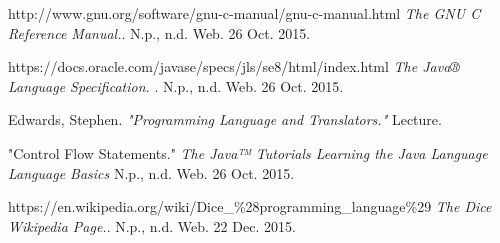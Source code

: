 \begin{homeworkProblem}
	
	
	\begin{thebibliography}{9}
		http://www.gnu.org/software/gnu-c-manual/gnu-c-manual.html
		\textit{The GNU C Reference Manual.}. 
		N.p., n.d. Web. 26 Oct. 2015.
		
		https://docs.oracle.com/javase/specs/jls/se8/html/index.html
		\textit{The Java® Language Specification.  }.
		N.p., n.d. Web. 26 Oct. 2015.
		
		Edwards, Stephen.
		\textit{"Programming Language and Translators."}
		 Lecture.
		 
		 "Control Flow Statements."
		 \textit{The Java™ Tutorials Learning the Java Language Language Basics}
		 N.p., n.d. Web. 26 Oct. 2015.
		 
		 https://en.wikipedia.org/wiki/Dice\_\%28programming\_language\%29
		 \textit{The Dice Wikipedia Page.}.
		 N.p., n.d. Web. 22 Dec. 2015.
	\end{thebibliography}
\end{homeworkProblem}